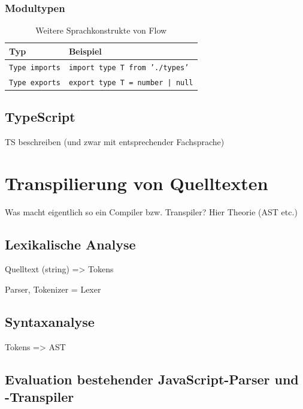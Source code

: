 \subsubsection{Modultypen}

\begin{table}[tbp]
  \footnotesize
  \begin{tabularx}{\textwidth}{@{}ll@{}}
    \midrule
    \textbf{Typ}               & \textbf{Beispiel}                      \\
    \midrule
    \texttt{Type imports}     & \texttt{import type T from './types'}   \\
    \texttt{Type exports}     & \texttt{export type T = number | null}  \\
    \midrule
  \end{tabularx}
  \caption{Weitere Sprachkonstrukte von Flow}
  \label{tab:flow-other-constructs}
\end{table}


\subsection{TypeScript}
  TS beschreiben (und zwar mit entsprechender Fachsprache)

\section{Transpilierung von Quelltexten}

  Was macht eigentlich so ein Compiler bzw. Transpiler? Hier Theorie (AST etc.)

\subsection{Lexikalische Analyse}

  Quelltext (string) => Tokens

  Parser, Tokenizer = Lexer

\subsection{Syntaxanalyse}

  Tokens => AST

\subsection{Evaluation bestehender JavaScript-Parser und -Transpiler}
\label{subsec:js-transpilers}

